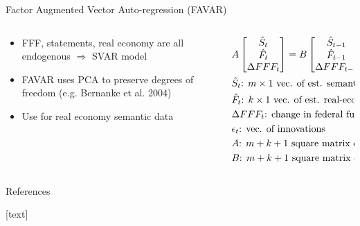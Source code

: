 \documentclass{beamer}
\begin{document}
\begin{frame}{Factor Augmented Vector Auto-regression (FAVAR)}
	
	\begin{columns}
		\begin{column}{0.5\textwidth}
			\begin{itemize}
				\item FFF, statements, real economy are all endogenous $\Rightarrow$ SVAR model
				\item FAVAR uses PCA to preserve degrees of freedom (e.g. Bernanke et al. 2004)
				\item Use for real economy semantic data
			\end{itemize}
		\end{column}
		\begin{column}{0.5\textwidth}
			 \scriptsize\begin{align}
			&A\begin{bmatrix}
			\hat{S}_t\\\hat{F}_t\\\-\Delta FFF_t
			\end{bmatrix} =
			B\begin{bmatrix}
			\hat{S}_{t-1}\\\hat{F}_{t-1}\\\Delta FFF_{t-1}
			\end{bmatrix} + \epsilon_t \nonumber \\
			&\hat{S}_t\text{: $m\times1$ vec. of est. semantic factors} \nonumber \\
			&\hat{F}_t\text{: $k\times1$ vec. of est. real-economic factors} \nonumber \\
			&\Delta FFF_t\text{: change in federal funds futures rate} \nonumber \\
			&\epsilon_t\text{: vec. of innovations} \nonumber \\
			&A\text{: $m+k+1$ square matrix of contemp. coeff.} \nonumber \\
			&B\text{: $m+k+1$ square matrix of lag coeff.} \nonumber
			\end{align}
		\end{column}
	\end{columns}
\end{frame}


\begin{frame}{References}
\nocite{gurkaynak2005actions}
\nocite{campbell2012macroeconomic}
\nocite{le2014distributed}
\nocite{mikolov2013efficient}
\nocite{bernanke2005measuring}

[text]



\end{frame}
\end{document}
